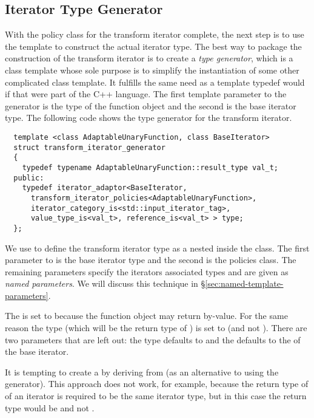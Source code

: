 \documentclass{netobjectdays}
\begin{document}
\subsection{Iterator Type Generator}
\label{sec:iter-type-generator}

With the policy class for the transform iterator complete, the next
step is to use the  template to construct the
actual iterator type. The best way to package the construction of the
transform iterator is to create a \emph{type generator}, which is a
class template whose sole purpose is to simplify the instantiation of
some other complicated class template. It fulfills the same need as a
template typedef would if that were part of the {C++} language.  The
first template parameter to the generator is the type of the function
object and the second is the base iterator type.  The following code
shows the type generator for the transform iterator.

{\footnotesize
\begin{verbatim}
  template <class AdaptableUnaryFunction, class BaseIterator>
  struct transform_iterator_generator
  {
    typedef typename AdaptableUnaryFunction::result_type val_t;
  public:
    typedef iterator_adaptor<BaseIterator, 
      transform_iterator_policies<AdaptableUnaryFunction>,
      iterator_category_is<std::input_iterator_tag>, 
      value_type_is<val_t>, reference_is<val_t> > type;
  };
\end{verbatim}
}

We use  to define the transform iterator type
as a nested  inside the
 class. The first parameter
to  is the base iterator type and the second
is the policies class. The remaining parameters specify the iterators
associated types and are given as \emph{named parameters}.  We will
discuss this technique in \S\ref{sec:named-template-parameters}.

The  is set to
 because the function object may
return by-value. For the same reason the  type (which
will be the return type of ) is set to 
(and not ). There are two parameters that are left out:
the  type defaults to  and the
 defaults to the  of
the base iterator.

It is tempting to create a  by deriving
from  (as an alternative to using the
generator).  This approach does not work, for example, because the
return type of  of an iterator is required to be the
same iterator type, but in this case the return type would be
 and not .
\end{document}
